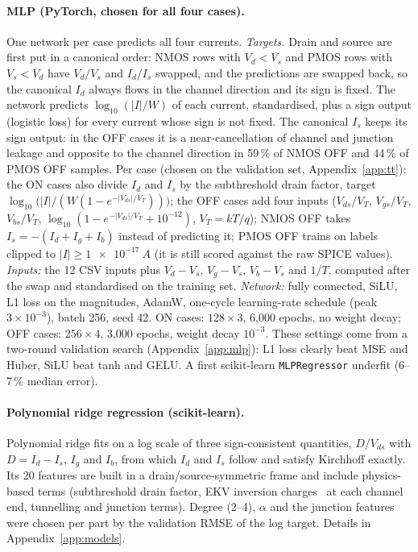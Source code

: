 \documentclass[11pt,a4paper]{article}
\begin{document}
\paragraph{MLP (PyTorch, chosen for all four cases).} One network per case predicts all four currents.
\emph{Targets.} Drain and source are first put in a canonical order: NMOS rows with $V_d < V_s$
and PMOS rows with $V_s < V_d$ have $V_d/V_s$ and $I_d/I_s$ swapped, and the predictions are swapped
back, so the canonical $I_d$ always flows in the channel direction and its sign is fixed. The network
predicts $\log_{10}(|I|/W)$ of each current, standardised, plus a sign output (logistic loss) for every
current whose sign is not fixed. The canonical $I_s$ keeps its sign output: in the OFF cases it is a
near-cancellation of channel and junction leakage and opposite to the channel direction in 59\,\% of
NMOS OFF and 44\,\% of PMOS OFF samples. Per case (chosen on the validation set, Appendix~\ref{app:tt}):
the ON cases also divide $I_d$ and $I_s$ by the subthreshold drain factor, target
$\log_{10}\bigl(|I| / (W(1-e^{-|V_{ds}|/V_T}))\bigr)$; the OFF cases add four inputs
($V_{ds}/V_T$, $V_{gs}/V_T$, $V_{bs}/V_T$, $\log_{10}(1-e^{-|V_{ds}|/V_T}+10^{-12})$, $V_T = kT/q$);
NMOS OFF takes $I_s = -(I_d + I_g + I_b)$ instead of predicting it; PMOS OFF trains on labels clipped
to $|I| \ge \SI{1e-17}{A}$ (it is still scored against the raw SPICE values).
\emph{Inputs:} the 12 CSV inputs plus $V_d-V_s$, $V_g-V_s$, $V_b-V_s$ and $1/T$, computed after the
swap and standardised on the training set.
\emph{Network:} fully connected, SiLU, L1 loss on the magnitudes, AdamW, one-cycle learning-rate
schedule (peak $3\times10^{-3}$), batch 256, seed 42. ON cases: $128\times3$, 6,000 epochs, no weight
decay; OFF cases: $256\times4$, 3,000 epochs, weight decay $10^{-3}$. These settings come from a
two-round validation search (Appendix~\ref{app:mlp}): L1 loss clearly beat MSE and Huber, SiLU beat
tanh and GELU. A first scikit-learn \texttt{MLPRegressor} underfit (6--7\,\% median error).

\paragraph{Polynomial ridge regression (scikit-learn).} Polynomial ridge fits on a log scale of three
sign-consistent quantities, $D/V_{ds}$ with $D = I_d - I_s$, $I_g$ and $I_b$, from which $I_d$ and $I_s$
follow and satisfy Kirchhoff exactly. Its 20 features are built in a drain/source-symmetric frame and
include physics-based terms (subthreshold drain factor, EKV inversion charges~\cite{ekv} at each channel
end, tunnelling and junction terms). Degree (2--4), $\alpha$ and the junction features were chosen per
part by the validation RMSE of the log target. Details in Appendix~\ref{app:models}.
\end{document}
